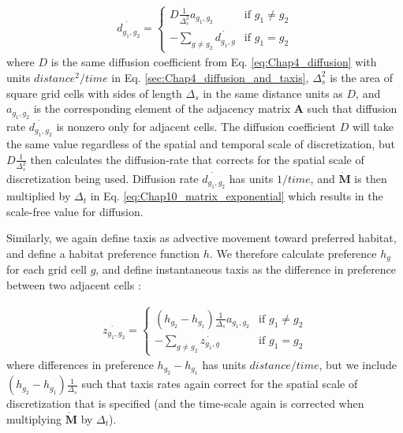 \begin{equation}
\begin{gathered} \label{eq:Chap10_diffusion}
  \dot{d_{g_1,g_2}} = 
  \begin{cases}
    D  \frac{1}{\Delta_s^2} a_{g_1,g_2} & \text{if } g_1 \neq g_2  \\ 
    -\sum_{g \neq g_2} \dot{d_{g_1,g}} & \text{if } g_1 = g_2 
  \end{cases}
\end{gathered}
\end{equation}
where \(D\) is the same diffusion coefficient from Eq. \ref{eq:Chap4_diffusion} with units \( distance^2 / time \) in Eq. \ref{sec:Chap4_diffusion_and_taxis}, \( \Delta_s^2 \) is the area of square grid cells with sides of length \(\Delta_s\) in the same distance units as \(D\), and \( a_{g_1,g_2} \) is the corresponding element of the adjacency matrix \(\mathbf{A}\) such that diffusion rate \(\dot{d_{g_1,g_2}}\) is nonzero only for adjacent cells.  The diffusion coefficient \(D\) will take the same value regardless of the spatial and temporal scale of discretization, but \( D \frac{1}{\Delta_s^2} \) then calculates the diffusion-rate that corrects for the spatial scale of discretization being used.  Diffusion rate \(\dot{d_{g_1,g_2}}\) has units \(1/time\), and \(\dot{\mathbf{M}}\) is then multiplied by \(\Delta_t\) in Eq. \ref{eq:Chap10_matrix_exponential} which results in the scale-free value for diffusion.  

Similarly, we again define taxis as advective movement toward preferred habitat, and define a habitat preference function \(h\).  We therefore calculate preference \(h_g\) for each grid cell \(g\), and define instantaneous taxis as the difference in preference between two adjacent cells \cite{hooten_statistical_2010}:

\begin{equation}
\begin{gathered} \label{eq:Chap10_taxis}
  \dot{z_{g_1,g_2}} = 
  \begin{cases}
    (h_{g_2} - h_{g_1}) \frac{1}{\Delta_s} a_{g_1,g_2} & \text{if } g_1 \neq g_2  \\ 
    -\sum_{g \neq g_2} \dot{z_{g_1,g}} & \text{if } g_1 = g_2 
  \end{cases}
\end{gathered}
\end{equation}
where differences in preference \(h_{g_2} - h_{g_1}\) has units \(distance / time \), but we include \( (h_{g_2} - h_{g_1}) \frac{1}{\Delta_s} \) such that taxis rates again correct for the spatial scale of discretization that is specified (and the time-scale again is corrected when multiplying \(\dot{\mathbf{M}}\) by \(\Delta_t\)).  

